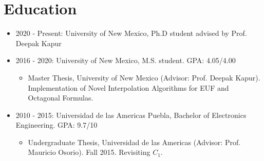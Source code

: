 \section{Education}

\begin{itemize}
\item 2020 - Present: University of New Mexico, Ph.D student advised by
  Prof. Deepak Kapur
\item 2016 - 2020: University of New Mexico, M.S. student. GPA: 4.05/4.00
  \begin{itemize}
    \item Master Thesis, University of New Mexico (Advisor: Prof. Deepak Kapur).
  Implementation of Novel Interpolation Algorithms for EUF and Octagonal Formulas.
  \end{itemize}
\item 2010 - 2015: Universidad de las Americas Puebla, Bachelor of
  Electronics Engineering. GPA: 9.7/10
  \begin{itemize}
    \item Undergraduate Thesis, Universidad de las Americas (Advisor: Prof.
  Mauricio Osorio). Fall 2015. Revisiting $C_1$.
  \end{itemize}
\end{itemize}
